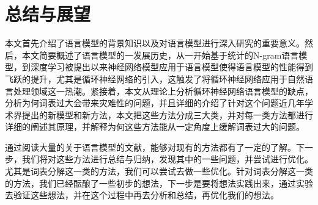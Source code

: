 \documentclass[12pt,a4paper]{article}
\begin{document}
\section{总结与展望}
本文首先介绍了语言模型的背景知识以及对语言模型进行深入研究的重要意义。然后，本文简要概述了语言模型的一发展历史，从一开始基于统计的N-gram语言模型，到深度学习被提出以来神经网络模型应用于语言模型使得语言模型的性能得到飞跃的提升，尤其是循环神经网络的引入，这触发了将循环神经网络应用于自然语言处理领域这一热潮。紧接着，本文从理论上分析循环神经网络语言模型的缺点，分析为何词表过大会带来灾难性的问题，并且详细的介绍了针对这个问题近几年学术界提出的新模型和新方法，本文把这些方法分成三大类，并对每一类方法都进行详细的阐述其原理，并解释为何这些方法能从一定角度上缓解词表过大的问题。

通过阅读大量的关于语言模型的文献，能够对现有的方法都有了一定的了解。下一步，我们将对这些方法进行总结与归纳，发现其中的一些问题，并尝试进行优化。尤其是词表分解这一类的方法，我们可以尝试去做一些优化。针对词表分解这一类的方法，我们已经酝酿了一些初步的想法，下一步是要将想法实践出来，通过实验去验证这些想法，并在这个过程中再去分析和总结，再优化我们的想法。
\newpage
{}

\end{document}
